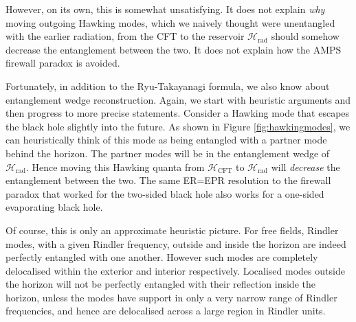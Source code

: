 \documentclass[12pt]{article}
\begin{document}
However, on its own, this is somewhat unsatisfying. It does not explain \emph{why} moving outgoing Hawking modes, which we naively thought were unentangled with the earlier radiation, from the CFT to the reservoir $\mathcal{H}_\text{rad}$ should somehow decrease the entanglement between the two. It does not explain how the AMPS firewall paradox \cite{almheiri2013black} is avoided.

Fortunately, in addition to the Ryu-Takayanagi formula, we also know about entanglement wedge reconstruction. Again, we start with heuristic arguments and then progress to more precise statements. Consider a Hawking mode that escapes the black hole slightly into the future. As shown in Figure \ref{fig:hawkingmodes}, we can heuristically think of this mode as being entangled with a partner mode behind the horizon. The partner modes will be in the entanglement wedge of $\mathcal{H}_\text{rad}$. Hence moving this Hawking quanta from $\mathcal{H}_\text{CFT}$ to $\mathcal{H}_\text{rad}$ will \emph{decrease} the entanglement between the two. The same ER=EPR resolution \cite{maldacena2013cool} to the firewall paradox that worked for the two-sided black hole also works for a one-sided evaporating black hole.

Of course, this is only an approximate heuristic picture. For free fields, Rindler modes, with a given Rindler frequency, outside and inside the horizon are indeed perfectly entangled with one another. However such modes are completely delocalised within the exterior and interior respectively. Localised modes outside the horizon will not be perfectly entangled with their reflection inside the horizon, unless the modes have support in only a very narrow range of Rindler frequencies, and hence are delocalised across a large region in Rindler units.
\end{document}
